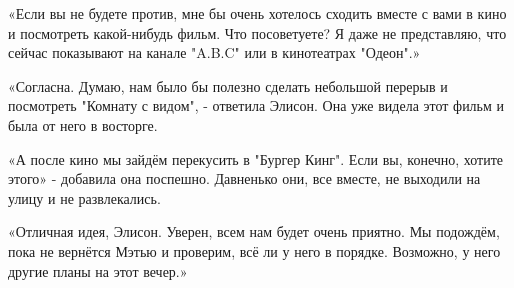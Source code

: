 \documentclass[a4paper,12pt]{book}
\begin{document}
\par
«Если вы не будете против, мне бы очень хотелось сходить вместе с вами в кино и посмотреть какой-нибудь фильм. Что посоветуете? Я даже не представляю, что сейчас показывают на канале "A.B.C" или в кинотеатрах "Одеон".»
\par
«Согласна. Думаю, нам было бы полезно сделать небольшой перерыв и посмотреть "Комнату с видом", - ответила Элисон. Она уже видела этот фильм и была от него в восторге.
\par
«А после кино мы зайдём перекусить в "Бургер Кинг". Если вы, конечно, хотите этого» - добавила она поспешно. Давненько они, все вместе, не выходили на улицу и не развлекались.
\par
«Отличная идея, Элисон. Уверен, всем нам будет очень приятно. Мы подождём, пока не вернётся Мэтью и проверим, всё ли у него в порядке. Возможно, у него другие планы на этот вечер.»
\end{document}
